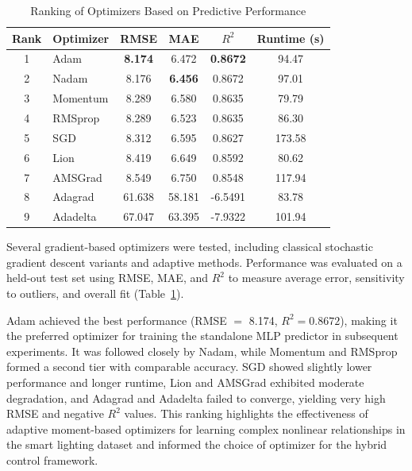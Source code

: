 \documentclass[conference]{IEEEtran}
\begin{document}
\begin{table}[H]
\centering
\caption{Ranking of Optimizers Based on Predictive Performance}
\label{tab:optimizer_ranking}
    \begin{tabular}{c|l|c|c|c|c}
        \hline
        \textbf{Rank} & \textbf{Optimizer} & \textbf{RMSE} & \textbf{MAE} & \textbf{$R^2$} & \textbf{Runtime (s)} \\
        \hline
        1 & Adam      & \textbf{8.174} & 6.472 & \textbf{0.8672} & 94.47 \\
        2 & Nadam     & 8.176 & \textbf{6.456} & 0.8672 & 97.01 \\
        3 & Momentum  & 8.289 & 6.580 & 0.8635 & 79.79 \\
        4 & RMSprop   & 8.289 & 6.523 & 0.8635 & 86.30 \\
        5 & SGD       & 8.312 & 6.595 & 0.8627 & 173.58 \\
        6 & Lion      & 8.419 & 6.649 & 0.8592 & 80.62 \\
        7 & AMSGrad   & 8.549 & 6.750 & 0.8548 & 117.94 \\
        8 & Adagrad   & 61.638 & 58.181 & -6.5491 & 83.78 \\
        9 & Adadelta  & 67.047 & 63.395 & -7.9322 & 101.94 \\
        \hline
    \end{tabular}
\end{table}

Several gradient-based optimizers were tested, including classical stochastic gradient descent variants and adaptive methods. Performance was evaluated on a held-out test set using RMSE, MAE, and $R^2$ to measure average error, sensitivity to outliers, and overall fit (Table~\ref{tab:optimizer_ranking}).

Adam achieved the best performance (RMSE $=$ 8.174, $R^2 = 0.8672$), making it the preferred optimizer for training the standalone MLP predictor in subsequent experiments. It was followed closely by Nadam, while Momentum and RMSprop formed a second tier with comparable accuracy. SGD showed slightly lower performance and longer runtime, Lion and AMSGrad exhibited moderate degradation, and Adagrad and Adadelta failed to converge, yielding very high RMSE and negative $R^2$ values. This ranking highlights the effectiveness of adaptive moment-based optimizers for learning complex nonlinear relationships in the smart lighting dataset and informed the choice of optimizer for the hybrid control framework.
\end{document}
